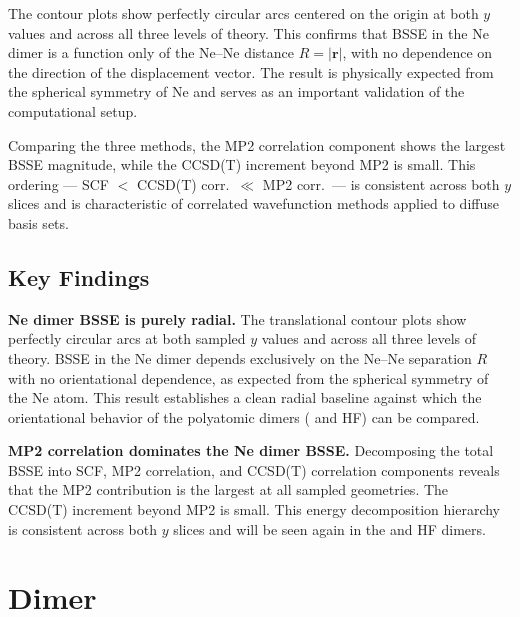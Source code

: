 The contour plots show perfectly circular arcs centered on the origin
at both $y$ values and across all three levels of theory. This confirms
that BSSE in the Ne dimer is a function only of the Ne--Ne distance
$R = |\mathbf{r}|$, with no dependence on the direction of the
displacement vector. The result is physically expected from the
spherical symmetry of Ne and serves as an important validation of the
computational setup.

Comparing the three methods, the MP2 correlation component shows the
largest BSSE magnitude, while the CCSD(T) increment beyond MP2 is
small. This ordering --- SCF $<$ CCSD(T) corr.\ $\ll$ MP2 corr.\ ---
is consistent across both $y$ slices and is characteristic of
correlated wavefunction methods applied to diffuse basis sets.

\subsection{Key Findings}

\begin{finding_box}
\textbf{Ne dimer BSSE is purely radial.}
The translational contour plots show perfectly circular arcs at both
sampled $y$ values and across all three levels of theory. BSSE in the
Ne dimer depends exclusively on the Ne--Ne separation $R$ with no
orientational dependence, as expected from the spherical symmetry of
the Ne atom. This result establishes a clean radial baseline against
which the orientational behavior of the polyatomic dimers (
and HF) can be compared.
\end{finding_box}

\begin{finding_box}
\textbf{MP2 correlation dominates the Ne dimer BSSE.}
Decomposing the total BSSE into SCF, MP2 correlation, and CCSD(T)
correlation components reveals that the MP2 contribution is the
largest at all sampled geometries. The CCSD(T) increment beyond MP2
is small. This energy decomposition hierarchy is consistent across
both $y$ slices and will be seen again in the  and HF dimers.
\end{finding_box}

\clearpage

\section{ Dimer}

